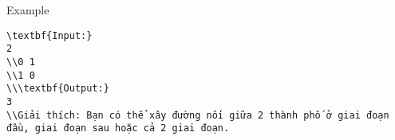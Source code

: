 Example
\begin{verbatim}
\textbf{Input:}
2
\\0 1
\\1 0
\\\textbf{Output:}
3
\\Giải thích: Bạn có thể xây đường nối giữa 2 thành phố ở giai đoạn đầu, giai đoạn sau hoặc cả 2 giai đoạn.\end{verbatim}